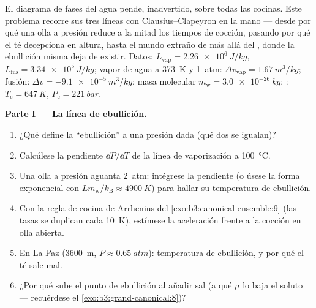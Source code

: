 \begin{problem}\label{pb:b3:phase-transitions:1}
El diagrama de fases del agua pende, inadvertido, sobre todas las cocinas. Este
problema recorre sus tres líneas con Clausius--Clapeyron en la mano ---
desde por qué una olla a presión reduce a la mitad los tiempos de cocción, pasando por qué el té
decepciona en altura, hasta el mundo extraño de más allá del ,
donde la ebullición misma deja de existir. Datos: $L_{\text{vap}}
= \qty{2.26e6}{J/kg}$, $L_{\text{fus}} = \qty{3.34e5}{J/kg}$;
vapor de agua a \qty{373}{K} y \qty{1}{atm}: $\Delta v_{\text{vap}}
= \qty{1.67}{m^3/kg}$; fusión: $\Delta v = \qty{-9.1e-5}{m^3/kg}$;
masa molecular $m_{\text{w}} = \qty{3.0e-26}{kg}$; :
$T_{\text{c}} = \qty{647}{K}$, $P_{\text{c}} = \qty{221}{bar}$.

\medskip\noindent\textbf{Parte I --- La línea de ebullición.}
\begin{enumerate}
  \item ¿Qué define la ``ebullición'' a una presión dada (qué dos
         se igualan)?
  \item Calcúlese la pendiente $\dd P/\dd T$ de la línea de vaporización
        a \qty{100}{\celsius}.
  \item Una olla a presión aguanta \qty{2}{atm}: intégrese la pendiente
        (o úsese la forma exponencial con $Lm_{\text{w}}/
        k_{\text{B}} \approx \qty{4900}{K}$) para hallar su temperatura
        de ebullición.
  \item Con la regla de cocina de Arrhenius del
        \cref{exo:b3:canonical-ensemble:9} (las tasas se duplican cada
        \qty{10}{K}), estímese la aceleración frente a la cocción en
        olla abierta.
  \item En La Paz (\qty{3600}{m}, $P \approx \qty{0.65}{atm}$):
        temperatura de ebullición, y por qué el té sale mal.
  \item ¿Por qué sube el punto de ebullición al añadir sal (a qué $\mu$
        lo baja el soluto --- recuérdese el
        \cref{exo:b3:grand-canonical:8})?
\end{enumerate}


\end{problem}
